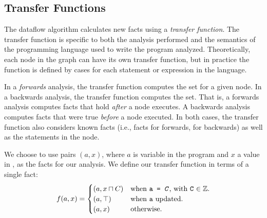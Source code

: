 \documentclass[12pt]{report}
\begin{document}




\subsection{Transfer Functions}
\label{back_subsec_transfer}

The dataflow algorithm calculates new facts using a \emph{transfer
  function}. The transfer function is specific to both the analysis
performed and the semantics of the programming language used to write
the program analyzed. Theoretically, each node in the graph can
have its own transfer function, but in practice the function is 
defined by cases for each statement or expression in the language. 

In a \emph{forwards} analysis, the transfer function computes the \out
set for a given node. In a backwards analysis, the transfer function
computes the \inE set. That is, a forwards analysis computes facts
that hold \emph{after} a node executes. A backwards analysis computes
facts that were true \emph{before} a node executed.  In both cases,
the transfer function also considers known facts (i.e., \inE facts for
forwards, \out for backwards) as well as the statements in the node.

We choose to use pairs $(a,x)$, where $a$ is variable in the program
and $x$ a value in \setLC, as the facts for our analysis. We define
our transfer function in terms of a single fact:
\begin{equation}
  f (a,x) = 
  \begin{cases}
    (a,x \lub C) & \text{when \texttt{a = \emph{C}}, with \texttt{C} $\in \mathbb{Z}$.} \\
    (a,\top) & \text{when \texttt{a} updated}. \\
    (a,x) & \text{otherwise}. \\
  \end{cases}
  \label{eqn_back4}
\end{equation}
\end{document}

